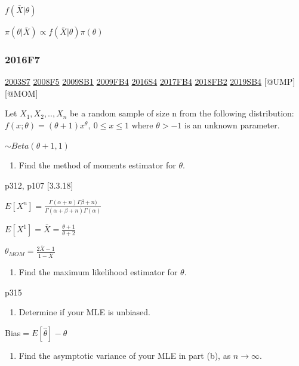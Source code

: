 \documentclass[6pt,Portrait]{article}
\providecommand{\tightlist}{%
  \setlength{\itemsep}{0pt}\setlength{\parskip}{0pt}}
\begin{document}
\(f(\bar X|\theta)\)

\(\pi(\theta|\bar X)\propto f(\bar X|\theta)\pi(\theta)\)

\hypertarget{f7-5}{%
\subsubsection{2016F7}\label{f7-5}}

\protect\hyperlink{s7}{2003S7} \protect\hyperlink{f5-3}{2008F5}
\protect\hyperlink{sb1}{2009SB1} \protect\hyperlink{fb4}{2009FB4}
\protect\hyperlink{s4-4}{2016S4} \protect\hyperlink{fb4-3}{2017FB4}
\protect\hyperlink{fb2-4}{2018FB2} \protect\hyperlink{sb4-2}{2019SB4}
{[}@UMP{]} {[}@MOM{]}

Let \(X_1,X_2,..,X_n\) be a random sample of size n from the following
distribution: \(f(x;\theta)=(\theta+1)x^\theta,\ 0\le x\le 1\) where
\(\theta>-1\) is an unknown parameter.

\(\sim Beta(\theta+1,1)\)

\begin{enumerate}
\def\labelenumi{(\alph{enumi})}
\tightlist
\item
  Find the method of moments estimator for \(\theta\).
\end{enumerate}

p312, p107 {[}3.3.18{]}

\(E[X^n]=\frac{\Gamma(\alpha+n)\Gamma\beta+n)}{\Gamma(\alpha+\beta+n)\Gamma(\alpha)}\)

\(E[X^1]=\bar X=\frac{\theta+1}{\theta+2}\)

\(\theta_{MOM}=\frac{2\bar X-1}{1-\bar X}\)

\begin{enumerate}
\def\labelenumi{(\alph{enumi})}
\setcounter{enumi}{1}
\tightlist
\item
  Find the maximum likelihood estimator for \(\theta\).
\end{enumerate}

p315

\begin{enumerate}
\def\labelenumi{(\alph{enumi})}
\setcounter{enumi}{2}
\tightlist
\item
  Determine if your MLE is unbiased.
\end{enumerate}

Bias\(=E[\hat\theta]-\theta\)

\begin{enumerate}
\def\labelenumi{(\alph{enumi})}
\setcounter{enumi}{3}
\tightlist
\item
  Find the asymptotic variance of your MLE in part (b), as
  \(n\to\infty\).
\end{enumerate}
\end{document}
